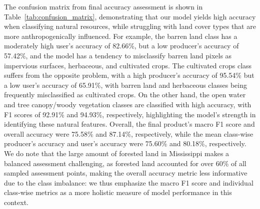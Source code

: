 The confusion matrix from final accuracy assessment is shown in Table~\ref{tab:confusion_matrix}, demonstrating that our model yields high accuracy when classifying natural resources, while struggling with land cover types that are more anthropogenically influenced.
For example, the barren land class has a moderately high user's accuracy of \num{82.66}\%, but a low producer's accuracy of \num{57.42}\%, and the model has a tendency to misclassify barren land pixels as impervious surfaces, herbaceous, and cultivated crops.
The cultivated crops class suffers from the opposite problem, with a high producer's accuracy of \num{95.54}\% but a low user's accuracy of \num{65.91}\%, with barren land and herbaceous classes being frequently misclassified as cultivated crops.
On the other hand, the open water and tree canopy/woody vegetation classes are classified with high accuracy, with F1 scores of \num{92.91}\% and \num{94.93}\%, respectively, highlighting the model's strength in identifying these natural features.
Overall, the final product's macro F1 score and overall accuracy were \num{75.58}\% and \num{87.14}\%, respectively, while the mean class-wise producer's accuracy and user's accuracy were \num{75.60}\% and \num{80.18}\%, respectively.
We do note that the large amount of forested land in Mississippi makes a balanced assessment challenging, as forested land accounted for over \num{60}\% of all sampled assessment points, making the overall accuracy metric less informative due to the class imbalance: we thus emphasize the macro F1 score and individual class-wise metrics as a more holistic measure of model performance in this context.



